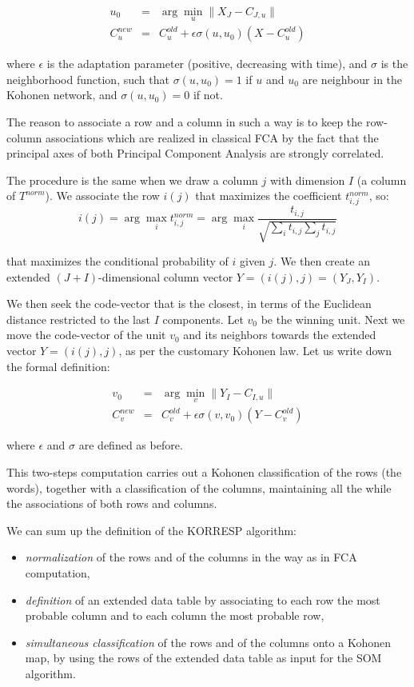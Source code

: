 \documentclass[preprint]{elsarticle}
\begin{document}
\begin{eqnarray}
u_0 &=& \arg\min_u \|X_J - C_{J,u}\|\\
C^{new}_u &=& C^{old}_u + \epsilon \sigma (u,u_0) (X -C^{old}_u) 
\end{eqnarray}

where $\epsilon$ is the adaptation parameter (positive, decreasing with time), and $\sigma$ is the neighborhood function, such that 
$\sigma(u,u_0) = 1$ if $u$ and $u_0$ are neighbour in the Kohonen network, and $\sigma(u,u_0) = 0$ if not.

The reason to associate a row and a column in such a way is to keep the row-column associations which are realized in classical FCA by the fact that the principal axes of both Principal Component Analysis are strongly correlated.

The procedure is the same when we draw a column $j$ with dimension $I$ (a column of $T^{norm}$). We associate the row $i(j)$ that maximizes the coefficient $t^{norm}_{i,j}$, so: 
\begin{equation}
i(j) = \arg\max_{i} t^{norm}_{i,j} = \arg\max_{i}\frac{t_{i,j}}{\sqrt{\sum_i t_{i,j} \sum_j t_{i,j}}}
\end{equation}

that maximizes the conditional probability of $i$ given $j$.
We then create an extended $(J+I)$-dimensional column vector 
$Y = (i(j), j) = (Y_J,Y_I)$. 

We then seek the code-vector that is the closest, in terms of the Euclidean distance restricted to the last $I$ components. Let $v_0$ be the winning unit. Next we move the code-vector of the unit $v_0$ and its neighbors towards the extended vector $Y = (i(j), j)$, as per the customary Kohonen law. Let us write down the formal definition:

\begin{eqnarray}
v_0 &=& \arg\min_v \|Y_I - C_{I,u}\| \\
C^{new}_v &=& C^{old}_v + \epsilon \sigma (v,v_0) (Y - C^{old}_v) 
\end{eqnarray}
 
where $\epsilon$ and $\sigma$ are defined as before.

This two-steps computation carries out a Kohonen classification of the rows (the words), together with a classification of the columns, maintaining all the while the associations of both rows and columns.

We can sum up the definition of the KORRESP algorithm:
\begin{itemize}
\item \textit{normalization} of the rows and of the columns in the way as in FCA computation,
\item \textit{definition} of an extended data table by associating to each row the most probable column and to each column the most probable row, 
\item  \textit{simultaneous classification} of the rows and of the columns onto a Kohonen map, by using the rows of the extended data table as input for the SOM algorithm.
\end{itemize}
\end{document}

